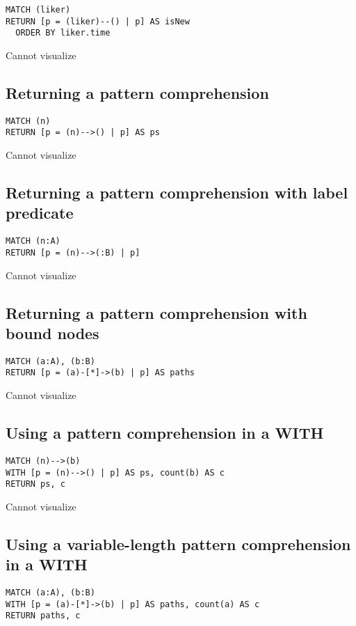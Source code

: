 \begin{lstlisting}
MATCH (liker)
RETURN [p = (liker)--() | p] AS isNew
  ORDER BY liker.time
\end{lstlisting}

Cannot visualize
\subsection{Returning a pattern comprehension}

\begin{lstlisting}
MATCH (n)
RETURN [p = (n)-->() | p] AS ps
\end{lstlisting}

Cannot visualize
\subsection{Returning a pattern comprehension with label predicate}

\begin{lstlisting}
MATCH (n:A)
RETURN [p = (n)-->(:B) | p]
\end{lstlisting}

Cannot visualize
\subsection{Returning a pattern comprehension with bound nodes}

\begin{lstlisting}
MATCH (a:A), (b:B)
RETURN [p = (a)-[*]->(b) | p] AS paths
\end{lstlisting}

Cannot visualize
\subsection{Using a pattern comprehension in a WITH}

\begin{lstlisting}
MATCH (n)-->(b)
WITH [p = (n)-->() | p] AS ps, count(b) AS c
RETURN ps, c
\end{lstlisting}

Cannot visualize
\subsection{Using a variable-length pattern comprehension in a WITH}

\begin{lstlisting}
MATCH (a:A), (b:B)
WITH [p = (a)-[*]->(b) | p] AS paths, count(a) AS c
RETURN paths, c
\end{lstlisting}

